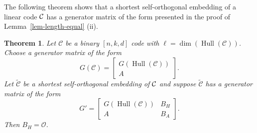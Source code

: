 \documentclass{article}
\newtheorem{theorem}{Theorem}[section]
\theoremstyle{definition}
\theoremstyle{remark}
\newcommand{\C}{\mbox{$\cal C$}}
\newcommand{\Hull}{\operatorname{Hull}}
\begin{document}
The following theorem shows that a shortest self-orthogonal embedding of a linear code $\C$ has a generator matrix of the form presented in the proof of Lemma~\ref{lem-length-equal} (ii).

\begin{theorem}\label{embstruct}
    Let $\mathcal{C}$ be a binary $[n, k, d]$ code with $\ell=\dim(\Hull(\mathcal{C}))$. Choose a generator matrix of the form
    \[
    G(\mathcal{C})=\begin{bmatrix}
        G(\operatorname{Hull}(\mathcal{C}))\\A
    \end{bmatrix}.
    \]
    Let $\tilde{\mathcal{C}}$ be a shortest self-orthogonal embedding of $\C$ and suppose $\tilde{\mathcal{C}}$ has a generator matrix of the form
    \[
    G' =\begin{bmatrix}
        G(\operatorname{Hull}(\mathcal{C})) & B_H \\A & B_A
    \end{bmatrix}.
    \]
    Then $B_H = \mathcal{O}$.
\end{theorem}
\end{document}
